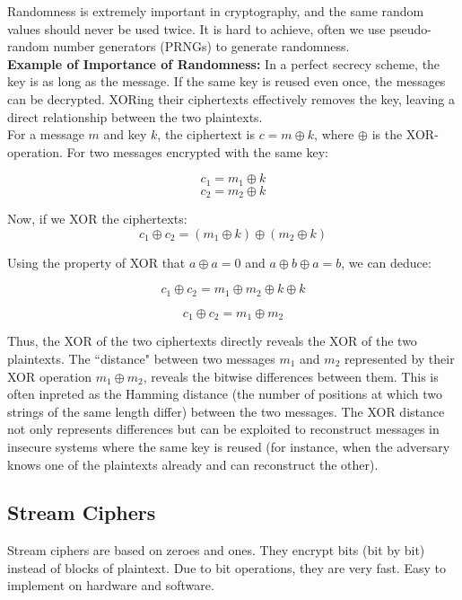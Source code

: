 Randomness is extremely important in cryptography, and the same random values should never be used twice. It is hard to achieve, often we use pseudo-random number generators (PRNGs) to generate randomness. \\

\textbf{Example of Importance of Randomness:}
In a perfect secrecy scheme, the key is as long as the message. If the same key is reused even once, the messages can be decrypted. XORing their ciphertexts effectively removes the key, leaving a direct relationship between the two plaintexts. \\

For a message $m$ and key $k$, the ciphertext is $c = m \oplus k$, where $\oplus$ is the XOR-operation. For two messages encrypted with the same key:

\[c_1 = m_1 \oplus k\] 
\[c_2 = m_2 \oplus k\]

Now, if we XOR the ciphertexts:
\[c_1 \oplus c_2 = (m_1 \oplus k) \oplus (m_2 \oplus k)\]

Using the property of XOR that \(a \oplus a = 0\) and \(a \oplus b \oplus a = b\), we can deduce:

\[
c_1 \oplus c_2 = m_1 \oplus m_2 \oplus k \oplus k
\]

\[
c_1 \oplus c_2 = m_1 \oplus m_2
\]

Thus, the XOR of the two ciphertexts directly reveals the XOR of the two plaintexts. The ``distance" between two messages $m_1$ and $m_2$ represented by their XOR operation $m_1 \oplus m_2$, reveals the bitwise differences between them. This is often inpreted as the Hamming distance (the number of positions at which two strings of the same length differ) between the two messages. The XOR distance not only represents differences but can be exploited to reconstruct messages in insecure systems where the same key is reused (for instance, when the adversary knows one of the plaintexts already and can reconstruct the other).

\subsection{Stream Ciphers}

\begin{defn}
Stream ciphers are based on zeroes and ones. They encrypt bits (bit by bit) instead of blocks of plaintext. Due to bit operations, they are very fast. Easy to implement on hardware and software.
\end{defn}

